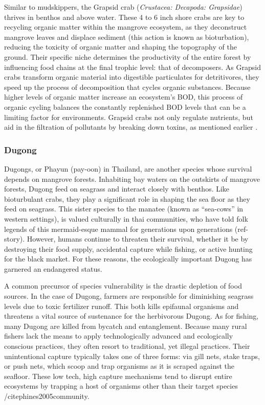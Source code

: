 Similar to mudskippers, the Grapsid crab (\textit{Crustacea: Decapoda: Grapsidae}) thrives in benthos and above water. These 4 to 6 inch shore crabs are key to recycling organic matter within the mangrove ecosystem, as they deconstruct mangrove leaves and displace sediment (this action is known as bioturbation), reducing the toxicity of organic matter and shaping the topography of the ground. Their specific niche determines the productivity of  the entire forest by influencing food chains at the final trophic level: that of decomposers. As Grapsid crabs transform organic material into digestible particulates for detritivores, they speed up the process of decomposition that cycles organic substances. Because higher levels of organic matter increase an ecosystem's BOD, this process of organic cycling balances the constantly replenished BOD levels that can be a limiting factor for environments. Grapsid crabs not only regulate nutrients, but aid in the filtration of pollutants by breaking down toxins, as mentioned earlier \citep{lee1998ecological}.

\subsubsection{Dugong}	

Dugongs, or Phayun (pay-oon) in Thailand, are another species whose survival depends on mangrove forests. Inhabiting bay waters on the outskirts of mangrove forests, Dugong feed on seagrass and interact closely with benthos. Like bioturbulant crabs, they play a significant role in shaping the sea floor as they feed on seagrass. This sister species to the manatee (known as ``sea-cows'' in western settings), is valued culturally in thai communities, who have told folk legends of this mermaid-esque mammal for generations upon generations (ref- story). However, humans continue to threaten their survival, whether it be by destroying their food supply, accidental capture while fishing, or active hunting for the black market. For these reasons, the ecologically important Dugong has garnered an endangered status. 

A common precursor of species vulnerability is the drastic depletion of food sources. In the case of Dugong, farmers are responsible for diminishing seagrass levels due to toxic fertilizer runoff.  This both kills epifaunal organisms and threatens a vital source of sustenance for the herbivorous Dugong. As for fishing, many Dugong are killed from bycatch and entanglement. Because many rural fishers lack the means to apply technologically advanced and ecologically conscious practices, they often resort to traditional, yet illegal practices. Their unintentional capture typically takes one of three forms: via gill nets, stake traps, or push nets, which scoop and trap organisms as it is scraped against the seafloor. These low tech, high capture mechanisms tend to disrupt entire ecosystems by trapping a host of organisms other than their target species /citep{hines2005community}. 

